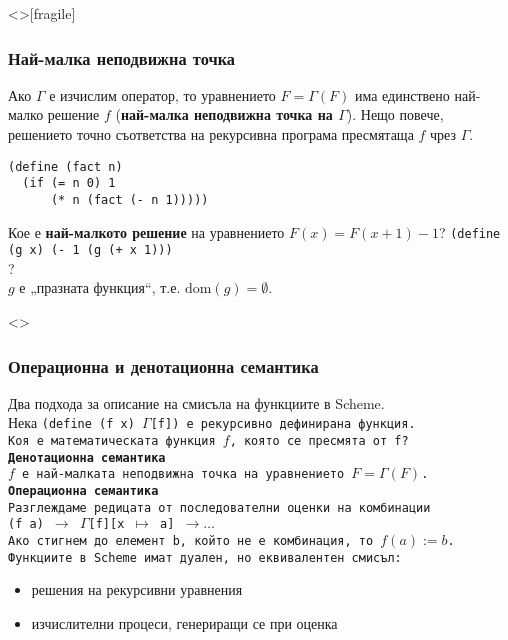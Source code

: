 \documentclass[alsotrans,beameroptions={aspectratio=169}]{beamerswitch}
\begin{document}
\begin{frame}<>[fragile]
  \frametitle{Най-малка неподвижна точка}

  \begin{theorem}
    Ако $\Gamma$ е изчислим оператор, то уравнението $F = \Gamma(F)$ има единствено най-малко решение $f$ \pause (\textbf{най-малка неподвижна точка на $\Gamma$}). \pause Нещо повече, решението точно съответства на рекурсивна програма пресмятаща $f$ чрез $\Gamma$.
  \end{theorem}
  \pause
\begin{lstlisting}
(define (fact n)
  (if (= n 0) 1
      (* n (fact (- n 1)))))
\end{lstlisting}
  \pause
  Кое е \textbf{най-малкото решение} на уравнението $F(x) = F(x+1) - 1$?
  \pause
\lstinline{(define (g x) (- 1 (g (+ x 1)))}\\
?\\
  \pause
  $g$ е „празната функция“, т.е. $\mathrm{dom}(g) = \emptyset$.
\end{frame}

\begin{frame}<>
  \frametitle{Операционна и денотационна семантика}

  Два подхода за описание на смисъла на функциите в Scheme.\\
  \pause
  Нека \tt{(define (f x) $\Gamma$[f])} е рекурсивно дефинирана функция.\\
  \pause
  \alert{Коя е математическата функция $f$, която се пресмята от \tt f?}\\[2ex]
  \pause
  \textbf{Денотационна семантика}\\
  $f$ е най-малката неподвижна точка на уравнението $F = \Gamma(F)$.\\[2ex]
  \pause
  \textbf{Операционна семантика}\\
  Разглеждаме редицата от последователни оценки на комбинации\\
  \tt{(f a)} $\rightarrow$ \tt{$\Gamma$[f][x $\mapsto$ a]} $\rightarrow\ldots$\\
  Ако стигнем до елемент \tt b, който не е комбинация, то $f(a) := b$.\\[2ex]
  \pause
  \alert{Функциите в Scheme имат дуален, но еквивалентен смисъл:}
  \begin{itemize}
  \item решения на рекурсивни уравнения
  \item изчислителни процеси, генериращи се при оценка
  \end{itemize}
\end{frame}
\end{document}
